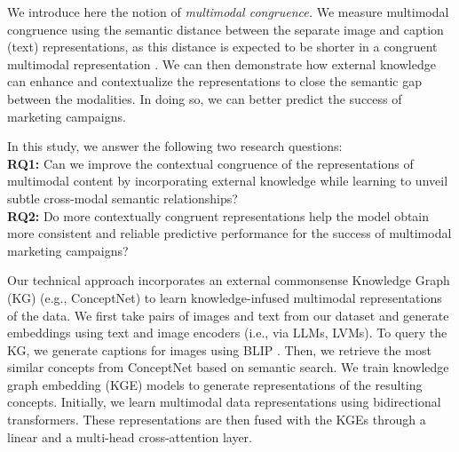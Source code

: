 
We introduce here the notion of \emph{multimodal congruence.} We measure multimodal congruence 
using the semantic distance between the separate image and caption (text) representations, 
as this distance is 
expected to be shorter in a congruent multimodal representation \cite{mandera2017explaining,frank2017word,beck2011congruence,maki2004semantic}. We can then demonstrate how external knowledge can enhance and contextualize the representations to close the semantic gap between the modalities. In doing so, we can better predict the success of marketing campaigns.  

In this study, we answer the following two research questions: \\
\textbf{RQ1:} Can we 
improve the contextual congruence of the representations of multimodal content by incorporating external knowledge while learning to unveil subtle cross-modal semantic relationships? \\
\textbf{RQ2:} Do more contextually congruent representations help the model obtain more consistent and reliable predictive performance for the success of multimodal marketing campaigns? %

Our technical approach incorporates  an external commonsense Knowledge Graph (KG) (e.g., ConceptNet) 
to learn knowledge-infused multimodal representations of the data. We first take pairs of images and text from our dataset and generate embeddings using text and image encoders (i.e., via LLMs, LVMs). To query the KG, %
we generate captions for images using BLIP \cite{li2022blip}. Then, we retrieve the most similar concepts from ConceptNet based on semantic search. We train knowledge graph embedding (KGE) models to generate representations of the resulting concepts. Initially, we learn multimodal data representations using bidirectional transformers. These representations are then fused with the KGEs through a linear and a multi-head cross-attention layer. 

